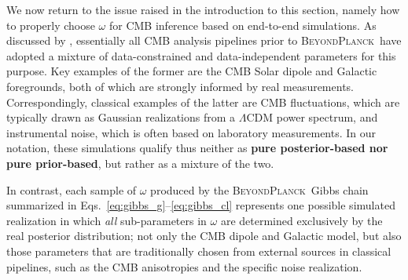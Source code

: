\documentclass[twocolumn]{aa}%
\newcommand{\BP}{\textsc{BeyondPlanck}}
\begin{document}
We now return to the issue raised in the introduction to this section,
namely how to properly choose $\omega$ for CMB inference based on
end-to-end simulations. As discussed by \citet{bp10}, essentially all
CMB analysis pipelines prior to \BP\ have adopted a mixture of
data-constrained and data-independent parameters for this purpose. Key
examples of the former are the CMB Solar dipole and Galactic
foregrounds, both of which are strongly informed by real
measurements. Correspondingly, classical examples of the latter are
CMB fluctuations, which are typically drawn as Gaussian realizations
from a $\Lambda$CDM power spectrum, and instrumental noise, which is
often based on laboratory measurements. In our notation, these
simulations qualify thus neither as {\bf pure posterior-based nor pure
prior-based}, but rather as a mixture of the two.

In contrast, each sample of $\omega$ produced by the \BP\ Gibbs chain
summarized in Eqs.~\eqref{eq:gibbs_g}--\eqref{eq:gibbs_cl} represents
one possible simulated realization in which \emph{all} sub-parameters
in $\omega$ are determined exclusively by the real posterior
distribution; not only the CMB dipole and Galactic model, but also
those parameters that are traditionally chosen from external sources
in classical pipelines, such as the CMB anisotropies and the
specific noise realization. 
\end{document}
